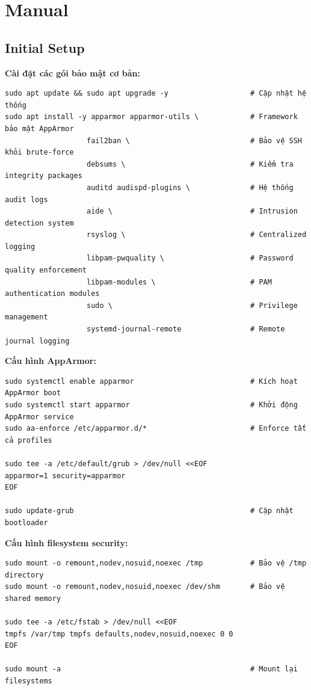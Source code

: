 \section{Manual}

\subsection{Initial Setup}

\noindent \textbf{Cài đặt các gói bảo mật cơ bản:}
\begin{verbatim}
sudo apt update && sudo apt upgrade -y                   # Cập nhật hệ thống
sudo apt install -y apparmor apparmor-utils \            # Framework bảo mật AppArmor
                   fail2ban \                            # Bảo vệ SSH khỏi brute-force
                   debsums \                             # Kiểm tra integrity packages
                   auditd audispd-plugins \              # Hệ thống audit logs
                   aide \                                # Intrusion detection system
                   rsyslog \                             # Centralized logging
                   libpam-pwquality \                    # Password quality enforcement
                   libpam-modules \                      # PAM authentication modules
                   sudo \                                # Privilege management
                   systemd-journal-remote                # Remote journal logging
\end{verbatim}

\noindent \textbf{Cấu hình AppArmor:}
\begin{verbatim}
sudo systemctl enable apparmor                           # Kích hoạt AppArmor boot
sudo systemctl start apparmor                            # Khởi động AppArmor service
sudo aa-enforce /etc/apparmor.d/*                        # Enforce tất cả profiles

sudo tee -a /etc/default/grub > /dev/null <<EOF
apparmor=1 security=apparmor
EOF

sudo update-grub                                         # Cập nhật bootloader
\end{verbatim}

\noindent \textbf{Cấu hình filesystem security:}
\begin{verbatim}
sudo mount -o remount,nodev,nosuid,noexec /tmp           # Bảo vệ /tmp directory
sudo mount -o remount,nodev,nosuid,noexec /dev/shm       # Bảo vệ shared memory

sudo tee -a /etc/fstab > /dev/null <<EOF
tmpfs /var/tmp tmpfs defaults,nodev,nosuid,noexec 0 0
EOF

sudo mount -a                                            # Mount lại filesystems
\end{verbatim}

